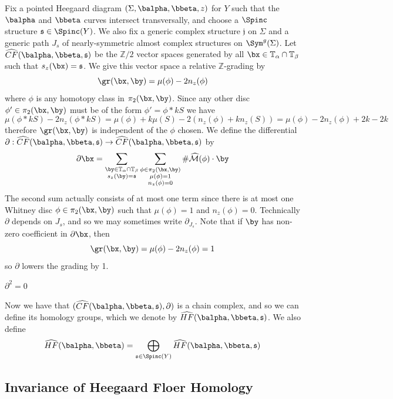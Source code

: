 Fix a pointed Heegaard diagram $(\Sigma,\balpha,\bbeta,z)$ for $Y$ such that the $\balpha$ and $\bbeta$ curves intersect transversally, and choose a $\Spinc$ structure $\mathfrak s \in \Spinc(Y)$. We also fix a generic complex structure $\mathfrak j$ on $\Sigma$ and a generic path $J_s$ of nearly-symmetric almost complex structures on $\Sym^g(\Sigma)$. Let $\widehat{CF}(\balpha,\bbeta,\mathfrak s)$ be the $\mathbb Z/2$ vector spaces generated by all $\bx \in \mathbb T_\alpha \cap \mathbb T_\beta$ such that $s_z(\bx)=\mathfrak s$. We give this vector space a relative $\mathbb Z$-grading by
\[ \gr(\bx,\by) = \mu(\phi) - 2n_z(\phi) \]
where $\phi$ is any homotopy class in $\pi_2(\bx,\by)$. Since any other disc $\phi' \in \pi_2(\bx,\by)$ must be of the form $\phi' = \phi * kS$ we have
\[ \mu(\phi * kS) - 2n_z(\phi * kS) = \mu(\phi) + k\mu(S) - 2\left( n_z(\phi) + kn_z(S) \right) = \mu(\phi)-2n_z(\phi) + 2k-2k \]
therefore $\gr(\bx,\by)$ is independent of the $\phi$ chosen. We define the differential $\partial : \widehat{CF}(\balpha,\bbeta,\mathfrak s) \rightarrow \widehat{CF}(\balpha,\bbeta,\mathfrak s)$ by
\[ \partial \bx = \sum_{\substack{\by \in \mathbb T_\alpha \cap \mathbb T_\beta \\ s_z(\by)=\mathfrak s}} \sum_{\substack{\phi \in \pi_2(\bx,\by) \\ \mu(\phi)=1 \\ n_z(\phi)=0}} \# \widehat{\mathcal M}(\phi) \cdot \by \]
The second sum actually consists of at most one term since there is at most one Whitney disc $\phi \in \pi_2(\bx,\by)$ such that $\mu(\phi)=1$ and $n_z(\phi)=0$. Technically $\partial$ depends on $J_s$, and so we may sometimes write $\partial_{J_s}$. Note that if $\by$ has non-zero coefficient in $\partial \bx$, then
\[ \gr(\bx,\by) = \mu(\phi) - 2n_z(\phi) = 1 \]
so $\partial$ lowers the grading by 1.
\begin{thm}
$\partial^2 = 0$
\end{thm}
Now we have that $(\widehat{CF}(\balpha,\bbeta,\mathfrak s),\partial)$ is a chain complex, and so we can define its homology groups, which we denote by $\widehat{HF}(\balpha,\bbeta,\mathfrak s)$. We also define
\[ \widehat{HF}(\balpha,\bbeta) = \bigoplus_{\mathfrak s \in \Spinc(Y)} \widehat{HF}(\balpha,\bbeta,\mathfrak s) \]








\subsection{Invariance of Heegaard Floer Homology}
\label{Invariance of Heegaard Floer Homology}





